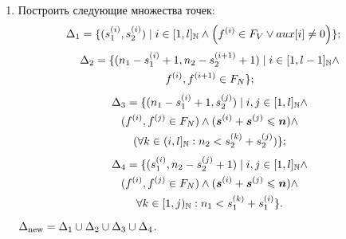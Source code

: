 \documentclass[14pt]{extarticle}
\newtheorem{note}{Замечание}
\begin{document}
\begin{enumerate}
   \begin{note}\label{Theor1ApplyingNote}
      Формула для пересчёта $f^{(i)}$ вытекает из теоремы~1
      в~\cite[п.~4]{Sakata88}, а верней, её обоснования,
      приведенного перед формулировкой. Использование теоремы~1
      продиктовано~\cite[п.~5, шаг~2]{Sakata88}.
   \end{note}


   \item\label{buildDeltaSet} Построить следующие множества точек:
         \begin{multline*}\shoveright{\Delta_1 = \{(s_1^{(i)},s_2^{(i)}) \mid
            i\in[1,l]_\N \wedge \left(f^{(i)}\in F_V \vee aux[i]\neq0\right)\};}
         \end{multline*}
         \begin{multline*}\Delta_2 =
            \{(n_1 - s_1^{(i)} + 1, n_2 - s_2^{(i+1)} + 1) \mid
            i\in[1,l-1]_\mathbb N \wedge \\f^{(i)},f^{(i+1)}\in F_N\};
         \end{multline*}
         \begin{multline*}\Delta_3 = \{(n_1 - s_1^{(i)} + 1,s_2^{(j)}) \mid
            i,j\in[1,l]_\mathbb N\wedge \\(f^{(i)},f^{(j)}\in F_N) \wedge
            (\boldsymbol{s}^{(i)} + \boldsymbol{s}^{(j)} \leqslant \boldsymbol{n})
            \wedge\\ (\forall k \in (i,l]_\mathbb N: n_2 < s_2^{(k)} +s_2^{(j)})\};
         \end{multline*}
         \begin{multline*}\Delta_4 = \{(s_1^{(i)}, n_2 - s_2^{(j)} + 1) \mid
            i,j\in[1,l]_\mathbb N\wedge \\(f^{(i)},f^{(j)}\in F_N)\wedge
            (\boldsymbol{s}^{(i)} + \boldsymbol{s}^{(j)} \leqslant \boldsymbol{n}) \wedge\\
            \forall k \in [1,j)_\mathbb N: n_1 < s_1^{(k)} + s_1^{(i)}\}.
         \end{multline*}
      $\Delta_{\text{new}} =
         \Delta_1 \cup \Delta_2 \cup \Delta_3 \cup \Delta_4$.


\end{enumerate}
\end{document}

